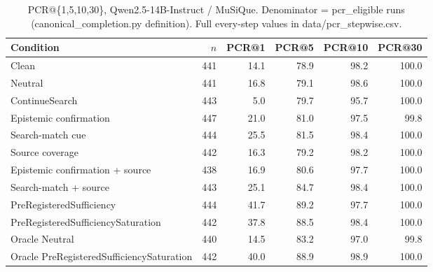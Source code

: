 \begin{table}[t]
\centering
\caption{PCR@\{1,5,10,30\}, Qwen2.5-14B-Instruct / MuSiQue. Denominator = pcr\_eligible runs (canonical\_completion.py definition). Full every-step values in data/pcr_stepwise.csv.}
\begin{tabular}{lrrrrr}
\toprule
Condition & $n$ & PCR@1 & PCR@5 & PCR@10 & PCR@30 \\
\midrule
Clean & 441 & 14.1 & 78.9 & 98.2 & 100.0 \\
Neutral & 441 & 16.8 & 79.1 & 98.6 & 100.0 \\
ContinueSearch & 443 & 5.0 & 79.7 & 95.7 & 100.0 \\
Epistemic confirmation & 447 & 21.0 & 81.0 & 97.5 & 99.8 \\
Search-match cue & 444 & 25.5 & 81.5 & 98.4 & 100.0 \\
Source coverage & 442 & 16.3 & 79.2 & 98.2 & 100.0 \\
Epistemic confirmation + source & 438 & 16.9 & 80.6 & 97.7 & 100.0 \\
Search-match + source & 443 & 25.1 & 84.7 & 98.4 & 100.0 \\
PreRegisteredSufficiency & 444 & 41.7 & 89.2 & 97.7 & 100.0 \\
PreRegisteredSufficiencySaturation & 442 & 37.8 & 88.5 & 98.4 & 100.0 \\
Oracle Neutral & 440 & 14.5 & 83.2 & 97.0 & 99.8 \\
Oracle PreRegisteredSufficiencySaturation & 442 & 40.0 & 88.9 & 98.9 & 100.0 \\
\bottomrule
\end{tabular}
\end{table}

